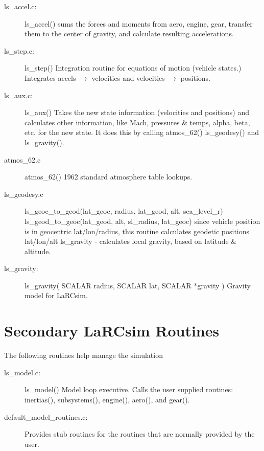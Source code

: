\documentclass[12pt,titlepage]{article}
\begin{document}
\begin{description}
  \item[ls\_accel.c:] ls\_accel() sums the forces and moments from aero,
    engine, gear, transfer them to the center of gravity, and calculate
    resulting accelerations.
    
  \item[ls\_step.c:] ls\_step() Integration routine for equations of
    motion (vehicle states.)  Integrates accels $\rightarrow$
    velocities and velocities $\rightarrow$ positions.
    
  \item[ls\_aux.c:] ls\_aux() Takes the new state information
    (velocities and positions) and calculates other information, like
    Mach, pressures \& temps, alpha, beta, etc. for the new state. It
    does this by calling atmos\_62() ls\_geodesy() and ls\_gravity().

  \item[atmos\_62.c] atmos\_62() 1962 standard atmosphere table lookups.
    
  \item[ls\_geodesy.c] ls\_geoc\_to\_geod(lat\_geoc, radius, lat\_geod, alt,
    sea\_level\_r) ls\_geod\_to\_geoc(lat\_geod, alt, sl\_radius, lat\_geoc)
    since vehicle position is in geocentric lat/lon/radius, this
    routine calculates geodetic positions lat/lon/alt ls\_gravity -
    calculates local gravity, based on latitude \& altitude.
    
  \item[ls\_gravity:] ls\_gravity( SCALAR radius, SCALAR lat, SCALAR
    *gravity ) Gravity model for LaRCsim.
\end{description}


\section{Secondary LaRCsim Routines}

The following routines help manage the simulation

\begin{description}
  \item[ls\_model.c:] ls\_model() Model loop executive.  Calls the user
    supplied routines: inertias(), subsystems(), engine(), aero(), and
    gear().
    
  \item[default_model_routines.c:] Provides stub routines for the
    routines that are normally provided by the user. 
\end{description}
\end{document}
